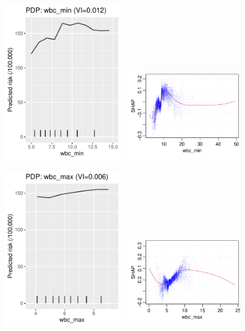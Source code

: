 \documentclass[12pt]{article}
\begin{document}
\begin{figure}[h]
\centering
\includegraphics[width=0.45\textwidth]{figures/pdp/wbc_min.pdf}
\includegraphics[width=0.45\textwidth]{figures/shap/wbc_min.pdf}
\end{figure}
\begin{figure}[h]
\centering
\includegraphics[width=0.45\textwidth]{figures/pdp/wbc_max.pdf}
\includegraphics[width=0.45\textwidth]{figures/shap/wbc_max.pdf}
\end{figure}
\end{document}
